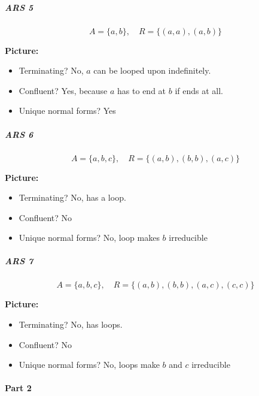 \documentclass{article}
\theoremstyle{plain}
\theoremstyle{definition}
\theoremstyle{remark}
\begin{document}
\subparagraph{ARS 5}
\[
A = \{a,b\}, \quad R = \{(a,a),(a,b)\}
\]

\textbf{Picture:}

\begin{itemize}
    \item Terminating? No, $a$ can be looped upon indefinitely.
    \item Confluent? Yes, because $a$ has to end at $b$ if ends at all.
    \item Unique normal forms? Yes
\end{itemize}

\subparagraph{ARS 6}
\[
A = \{a,b,c\}, \quad R = \{(a,b),(b,b),(a,c)\}
\]

\textbf{Picture:}

\begin{itemize}
    \item Terminating? No, has a loop.
    \item Confluent? No
    \item Unique normal forms? No, loop makes $b$ irreducible 
\end{itemize}

\subparagraph{ARS 7}
\[
A = \{a,b,c\}, \quad R = \{(a,b),(b,b),(a,c),(c,c)\}
\]

\textbf{Picture:}

\begin{itemize}
    \item Terminating? No, has loops.
    \item Confluent? No
    \item Unique normal forms? No, loops make $b$ and $c$ irreducible
\end{itemize}

\paragraph{Part 2}
\end{document}
